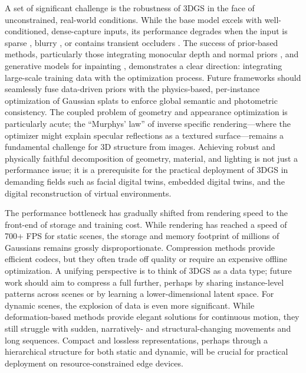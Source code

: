 \documentclass[11pt,a4paper]{article}
\begin{document}
A set of significant challenge is the robustness of 3DGS in the face of unconstrained, real-world conditions. While the base model excels with well-conditioned, dense-capture inputs, its performance degrades when the input is sparse \cite{arxiv:2311.17910v1}, blurry \cite{arxiv:2401.00834v1}, or contains transient occluders \cite{arxiv:2402.07181v1}. The success of prior-based methods, particularly those integrating monocular depth and normal priors \cite{arxiv:2403.08498v1}, and generative models for inpainting \cite{arxiv:2303.12789v2}, demonstrates a clear direction: integrating large-scale training data with the optimization process. Future frameworks should seamlessly fuse data-driven priors with the physics-based, per-instance optimization of Gaussian splats to enforce global semantic and photometric consistency. The coupled problem of geometry and appearance optimization is particularly acute; the ``Murphys' law'' of inverse specific rendering---where the optimizer might explain specular reflections as a textured surface---remains a fundamental challenge for 3D structure from images. Achieving robust and physically faithful decomposition of geometry, material, and lighting \cite{arxiv:2311.17910v1,arxiv:2403.08498v1,arxiv:2311.16043v1} is not just a performance issue; it is a prerequisite for the practical deployment of 3DGS in demanding fields such as facial digital twins, embedded digital twins, and the digital reconstruction of virtual environments.

The performance bottleneck has gradually shifted from rendering speed to the front-end of storage and training cost. While rendering has reached a speed of 700+ FPS for static scenes, the storage and memory footprint of millions of Gaussians remains grossly disproportionate. Compression methods \cite{arxiv:2407.11309v1,arxiv:2311.13681v2,arxiv:1610.06049v1} provide efficient codecs, but they often trade off quality or require an expensive offline optimization. A unifying perspective is to think of 3DGS as a data type; future work should aim to compress a full further, perhaps by sharing instance-level patterns across scenes or by learning a lower-dimensional latent space. For dynamic scenes, the explosion of data is even more significant. While deformation-based methods \cite{arxiv:2403.08498v1} provide elegant solutions for continuous motion, they still struggle with sudden, narratively- and structural-changing movements and long sequences. Compact and lossless representations, perhaps through a hierarchical structure for both static and dynamic, will be crucial for practical deployment on resource-constrained edge devices.
\end{document}
